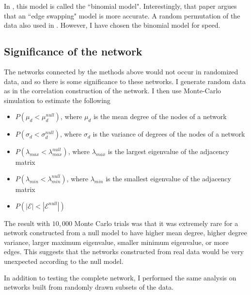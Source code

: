 \documentclass[10pt]{article}
\theoremstyle{definition}
\numberwithin{theorem}{section}
\numberwithin{definition}{section}
\numberwithin{lemma}{section}
\numberwithin{corollary}{section}
\numberwithin{clm}{section}
\numberwithin{rmk}{section}
\newcommand{\cE}{\mathcal{E}}
\begin{document}
In \cite{coocc}, this model is called the ``binomial model". Interestingly, that paper argues that an ``edge swapping" model is more accurate. A random permutation of the data also used in \cite{gut}. However, I have chosen the binomial model for speed.

\subsection{Significance of the network}
The networks connected by the methods above would not occur in randomized data, and so there is some significance to these networks. I generate random data as in the correlation construction of the network. I then use Monte-Carlo simulation to estimate the following
\begin{itemize}
	\item $P(\mu_d < \mu_d^{null})$, where $\mu_d$ is the mean degree of the nodes of a network
	\item $P(\sigma_d < \sigma_d^{null})$, where $\sigma_d$ is the variance of degrees of the nodes of a network
	\item $P(\lambda_{max} < \lambda_{max}^{null})$, where $\lambda_{max}$ is the largest eigenvalue of the adjacency matrix
	\item $P(\lambda_{min} < \lambda_{min}^{null})$, where $\lambda_{min}$ is the smallest eigenvalue of the adjacency matrix
	\item $P(|\cE| < |\cE^{null}|)$
\end{itemize} 

The result with $10,000$ Monte Carlo trials was that it was extremely rare for a network constructed from a null model to have higher mean degree, higher degree variance, larger maximum eigenvalue, smaller minimum eigenvalue, or more edges. This suggests that the networks constructed from real data would be very unexpected according to the null model. 

In addition to testing the complete network, I performed the same analysis on networks built from randomly drawn subsets of the data.
\end{document}
